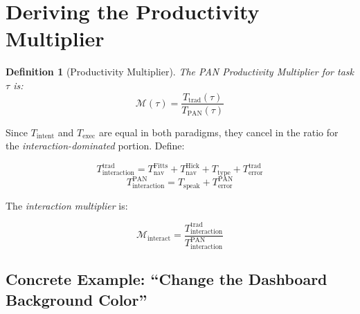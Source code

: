 \documentclass[11pt, a4paper]{article}
\newtheorem{definition}{Definition}
\begin{document}
\section{Deriving the Productivity Multiplier}

\begin{definition}[Productivity Multiplier]
The PAN Productivity Multiplier for task $\tau$ is:
\begin{equation}
  \boxed{\mathcal{M}(\tau) = \frac{T_{\text{trad}}(\tau)}{T_{\text{PAN}}(\tau)}}
  \label{eq:multiplier}
\end{equation}
\end{definition}

Since $T_{\text{intent}}$ and $T_{\text{exec}}$ are equal in both paradigms, they
cancel in the ratio for the \emph{interaction-dominated} portion. Define:

\begin{equation}
  T_{\text{interaction}}^{\text{trad}} = T_{\text{nav}}^{\text{Fitts}} + T_{\text{nav}}^{\text{Hick}} + T_{\text{type}} + T_{\text{error}}^{\text{trad}}
\end{equation}
\begin{equation}
  T_{\text{interaction}}^{\text{PAN}} = T_{\text{speak}} + T_{\text{error}}^{\text{PAN}}
\end{equation}

The \emph{interaction multiplier} is:

\begin{equation}
  \mathcal{M}_{\text{interact}} = \frac{T_{\text{interaction}}^{\text{trad}}}{T_{\text{interaction}}^{\text{PAN}}}
\end{equation}

\subsection{Concrete Example: ``Change the Dashboard Background Color''}
\end{document}

